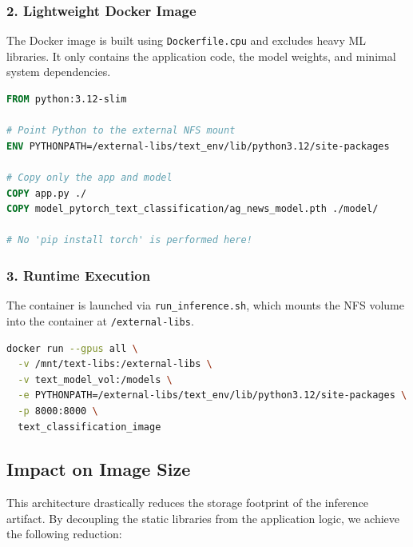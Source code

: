 \documentclass[11pt,a4paper]{article}
\begin{document}
\subsubsection{2. Lightweight Docker Image}
The Docker image is built using \texttt{Dockerfile.cpu} and excludes heavy ML libraries. It only contains the application code, the model weights, and minimal system dependencies.

\begin{lstlisting}[language=Dockerfile, caption={Dockerfile.cpu Configuration}]
FROM python:3.12-slim

# Point Python to the external NFS mount
ENV PYTHONPATH=/external-libs/text_env/lib/python3.12/site-packages

# Copy only the app and model
COPY app.py ./
COPY model_pytorch_text_classification/ag_news_model.pth ./model/

# No 'pip install torch' is performed here!
\end{lstlisting}

\subsubsection{3. Runtime Execution}
The container is launched via \texttt{run\_inference.sh}, which mounts the NFS volume into the container at \texttt{/external-libs}.

\begin{lstlisting}[language=bash, caption={Mounting the NFS Library Volume}]
docker run --gpus all \
  -v /mnt/text-libs:/external-libs \
  -v text_model_vol:/models \
  -e PYTHONPATH=/external-libs/text_env/lib/python3.12/site-packages \
  -p 8000:8000 \
  text_classification_image
\end{lstlisting}

\subsection{Impact on Image Size}

This architecture drastically reduces the storage footprint of the inference artifact. By decoupling the static libraries from the application logic, we achieve the following reduction:
\end{document}

